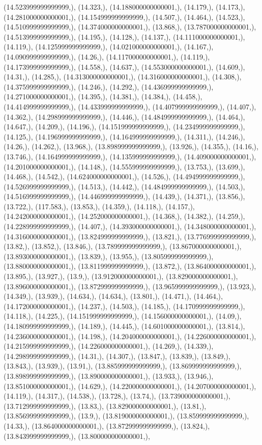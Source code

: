 \documentclass{article}
\begin{document}
(14.523999999999999,), (14.323,), (14.188000000000001,), (14.179,), (14.173,), (14.281000000000001,), (14.154999999999999,), (14.507,), (14.464,), (14.523,), (14.510999999999999,), (14.374000000000001,), (13.868,), (13.787000000000001,), (14.513999999999999,), (14.195,), (14.128,), (14.137,), (14.111000000000001,), (14.119,), (14.125999999999999,), (14.021000000000001,), (14.167,), (14.090999999999999,), (14.26,), (14.117000000000001,), (14.119,), (14.173999999999999,), (14.558,), (14.637,), (14.553000000000001,), (14.609,), (14.31,), (14.285,), (14.313000000000001,), (14.316000000000001,), (14.308,), (14.375999999999999,), (14.246,), (14.292,), (14.436999999999999,), (14.271000000000001,), (14.395,), (14.381,), (14.384,), (14.458,), (14.414999999999999,), (14.433999999999999,), (14.407999999999999,), (14.407,), (14.362,), (14.298999999999999,), (14.446,), (14.484999999999999,), (14.464,), (14.647,), (14.209,), (14.196,), (14.151999999999999,), (14.234999999999999,), (14.125,), (14.196999999999999,), (14.164999999999999,), (14.311,), (14.246,), (14.26,), (14.262,), (13.968,), (13.898999999999999,), (13.926,), (14.355,), (14.16,), (13.746,), (14.164999999999999,), (14.135999999999999,), (14.409000000000001,), (14.201000000000001,), (14.148,), (14.555999999999999,), (13.753,), (13.699,), (14.468,), (14.542,), (14.624000000000001,), (14.526,), (14.494999999999999,), (14.526999999999999,), (14.513,), (14.442,), (14.484999999999999,), (14.503,), (14.516999999999999,), (14.446999999999999,), (14.439,), (14.371,), (13.856,), (13.722,), (117.583,), (13.853,), (14.359,), (14.118,), (14.157,), (14.242000000000001,), (14.252000000000001,), (14.368,), (14.382,), (14.259,), (14.228999999999999,), (14.407,), (14.393000000000001,), (14.348000000000001,), (14.316000000000001,), (13.824999999999999,), (13.821,), (13.776999999999999,), (13.82,), (13.852,), (13.846,), (13.789999999999999,), (13.867000000000001,), (13.893000000000001,), (13.839,), (13.955,), (13.805999999999999,), (13.880000000000001,), (13.811999999999999,), (13.872,), (13.864000000000001,), (13.895,), (13.927,), (13.9,), (13.912000000000001,), (13.829000000000001,), (13.896000000000001,), (13.872999999999999,), (13.965999999999999,), (13.923,), (14.349,), (13.939,), (14.634,), (14.634,), (13.801,), (14.471,), (14.464,), (14.172000000000001,), (14.237,), (14.503,), (14.185,), (14.170999999999999,), (14.118,), (14.225,), (14.151999999999999,), (14.156000000000001,), (14.09,), (14.180999999999999,), (14.189,), (14.445,), (14.601000000000001,), (13.814,), (14.236000000000001,), (14.198,), (14.204000000000001,), (14.226000000000001,), (14.215999999999999,), (14.226000000000001,), (14.269,), (14.339,), (14.298999999999999,), (14.31,), (14.307,), (13.847,), (13.839,), (13.849,), (13.843,), (13.939,), (13.91,), (13.885999999999999,), (13.869999999999999,), (13.898999999999999,), (13.890000000000001,), (13.933,), (13.946,), (13.851000000000001,), (14.629,), (14.220000000000001,), (14.207000000000001,), (14.119,), (14.317,), (14.538,), (13.728,), (13.74,), (13.739000000000001,), (13.712999999999999,), (13.83,), (13.829000000000001,), (13.81,), (13.856999999999999,), (13.9,), (13.819000000000001,), (13.859999999999999,), (14.33,), (13.864000000000001,), (13.872999999999999,), (13.824,), (13.843999999999999,), (13.800000000000001,), 
\end{document}
